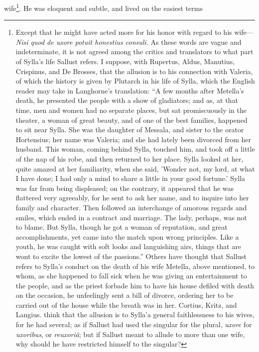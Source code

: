 wife\footnote{Except that he might have acted more for his honor with
regard to his wife—\emph{Nisi quod de uxore potuit honestius consuli.} As
these words are vague and indeterminate, it is not agreed among the
critics and translators to what part of Sylla's life Sallust refers.
I suppose, with Rupertus, Aldus, Manutius, Crispinus, and De Brosses,
that the allusion is to his connection with Valeria, of which the
history is given by Plutarch in his life of Sylla, which the English
reader may take in Langhorne's translation: ``A few months after
Metella's death, he presented the people with a show of gladiators;
and as, at that time, men and women had no separate places, but sat
promiscuously in the theater, a woman of great beauty, and of one of
the best families, happened to sit near Sylla. She was the daughter of
Messala, and sister to the orator Hortensius; her name was Valeria;
and she had lately been divorced from her husband. This woman, coming
behind Sylla, touched him, and took off a little of the nap of his
robe, and then returned to her place. Sylla looked at her, quite
amazed at her familiarity, when she said, 'Wonder not, my lord, at
what I have done; I had only a mind to share a little in your good
fortune.' Sylla was far from being displeased; on the contrary, it
appeared that he was flattered very agreeably, for he sent to ask her
name, and to inquire into her family and character. Then followed an
interchange of amorous regards and smiles, which ended in a contract
and marriage. The lady, perhaps, was not to blame. But Sylla, though
he got a woman of reputation, and great accomplishments, yet came into
the match upon wrong principles. Like a youth, he was caught with soft
looks and languishing airs, things that are wont to excite the lowest
of the passions.'' Others have thought that Sallust refers to Sylla's
conduct on the death of his wife Metella, above mentioned, to whom, as
she happened to fall sick when he was giving an entertainment to the
people, and as the priest forbade him to have his house defiled with
death on the occasion, he unfeelingly sent a bill of divorce, ordering
her to be carried out of the house while the breath was in her.
Cortius, Kritz, and Langius. think that the allusion is to Sylla'a
general faithlessness to his wives, for he had several; as if Sallust
had used the singular for the plural, \emph{uxore} for \emph{uxoribus}, or
\emph{reuxoriâ}; but if Sallust meant to allude to more than one wife, why
should he have restricted himself to the singular?}. He was eloquent and subtle, and lived on the easiest terms
